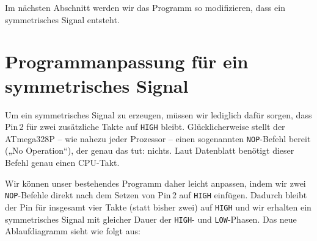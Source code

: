 \documentclass[a4paper,12pt]{article}
\begin{document}
\noindent
Im nächsten Abschnitt werden wir das Programm so modifizieren, dass ein
symmetrisches Signal entsteht.


\newpage

\section{Programmanpassung für ein symmetrisches Signal}
\label{sec:Programmanpassung}

Um ein symmetrisches Signal zu erzeugen, müssen wir lediglich dafür sorgen,
dass Pin 2 für zwei zusätzliche Takte auf \texttt{HIGH} bleibt.
Glücklicherweise stellt der ATmega328P – wie nahezu jeder Prozessor – einen
sogenannten \texttt{NOP}-Befehl bereit („No Operation“), der genau das tut:
nichts. Laut Datenblatt benötigt dieser Befehl genau einen CPU-Takt.

Wir können unser bestehendes Programm daher leicht anpassen, indem wir zwei
\texttt{NOP}-Befehle direkt nach dem Setzen von Pin 2 auf \texttt{HIGH}
einfügen. Dadurch bleibt der Pin für insgesamt vier Takte (statt bisher zwei)
auf \texttt{HIGH} und wir erhalten ein symmetrisches Signal mit gleicher Dauer
der \texttt{HIGH}- und \texttt{LOW}-Phasen.
Das neue Ablaufdiagramm sieht wie folgt aus:

\begin{center}
\end{center}
\end{document}
